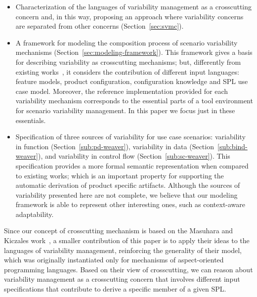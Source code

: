 \documentclass{sig-alt-full}
\begin{document}
\begin{itemize}
\item Characterization of the languages of variability management as a
crosscutting concern and, in this way, proposing an approach where variability
concerns are separated from other concerns (Section~\ref{sec:svmc}).


\item A framework for modeling the composition process of scenario variability
mechanisms (Section~\ref{sec:modeling-framework}). This framework gives a basis for
describing variability as crosscutting mechanisms; but, differently from existing
works~\cite{Morin:2008aa,Groher:2008aa}, it considers the contribution of different input
languages: feature models, product configuration, configuration knowledge and SPL use case model. Moreover, the reference implementation provided for each variability
mechanism corresponds to the essential parts of a tool environment for scenario
variability management. In this paper we focus just in these essentials.

\item Specification of three sources of variability for use case
scenarios: variability in function (Section~\ref{sub:pd-weaver}),
variability in data (Section~\ref{sub:bind-weaver}), and variability in control
flow (Section~\ref{sub:sc-weaver}). This specification provides a more formal
semantic representation when compared to existing works; which is an important property
for supporting the automatic derivation of product specific artifacts. Although the sources of
variability presented here are not complete, we believe that our modeling framework is able to represent
other interesting ones, such as context-aware adaptability.
\end{itemize}



Since our concept of crosscutting mechanism is based on the Masuhara and
Kiczales work~\cite{Masuhara:2003aa}, a smaller contribution of this paper is to apply
their ideas to the languages of variability management,  reinforcing the
generality of their model, which was originally instantiated only for mechanisms
of aspect-oriented programming languages. Based on their view of crosscutting, we
can reason about variability management as a crosscutting concern that involves
different input specifications that contribute to derive a specific member of a
given SPL. 
\end{document}
